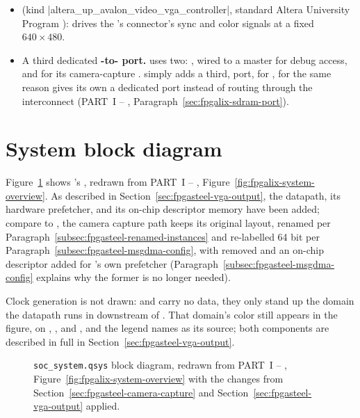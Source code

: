 \begin{itemize}
    \item \textbf{} (kind |altera_up_avalon_video_vga_controller|, standard Altera University Program ): drives the 's  connector's sync and color signals at a fixed $640\times480$.
    \item A third dedicated \textbf{-to-  port.}  uses two: , wired to a   master for debug access, and  for its camera-capture .  simply adds a third,  port, for , for the same reason  gives its own  a dedicated port instead of routing through the  interconnect (PART~I -- , Paragraph~\ref{sec:fpgalix-sdram-port}).
\end{itemize}

\section{System block diagram}
\label{sec:fpgasteel-system-block-diagram}

Figure~\ref{fig:fpgasteel-system-overview} shows 's , redrawn from PART~I -- , Figure~\ref{fig:fpgalix-system-overview}. As described in Section~\ref{sec:fpgasteel-vga-output}, the  datapath, its hardware prefetcher, and its on-chip descriptor memory have been added; compare to , the camera capture path keeps its original layout, renamed per Paragraph~\ref{subsec:fpgasteel-renamed-instances} and re-labelled 64 bit per Paragraph~\ref{subsec:fpgasteel-msgdma-config}, with  removed and an on-chip descriptor  added for 's own prefetcher (Paragraph~\ref{subsec:fpgasteel-msgdma-config} explains why the former is no longer needed).

Clock generation is not drawn:  and  carry no data, they only stand up the  domain the datapath runs in downstream of . That domain's color still appears in the figure, on , , and , and the legend names  as its source; both components are described in full in Section~\ref{sec:fpgasteel-vga-output}.

\begin{landscape}
\begin{figure}[p]
    \centering
    
    \caption{\texttt{soc\_system.qsys} block diagram, redrawn from PART~I -- , Figure~\ref{fig:fpgalix-system-overview} with the changes from Section~\ref{sec:fpgasteel-camera-capture} and Section~\ref{sec:fpgasteel-vga-output} applied.}
    \label{fig:fpgasteel-system-overview}
\end{figure}
\end{landscape}

